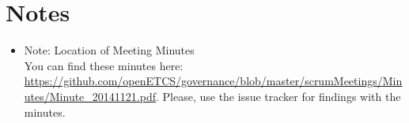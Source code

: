 \documentclass[a4paper, 11pt]{article}
\begin{document}
\section{Notes}
\begin{itemize}

\item Note: Location of Meeting Minutes\\
You can find these minutes here: \url{https://github.com/openETCS/governance/blob/master/scrumMeetings/Minutes/Minute_20141121.pdf}. Please, use the issue tracker for findings with the minutes.

\end{itemize}
\end{document}
